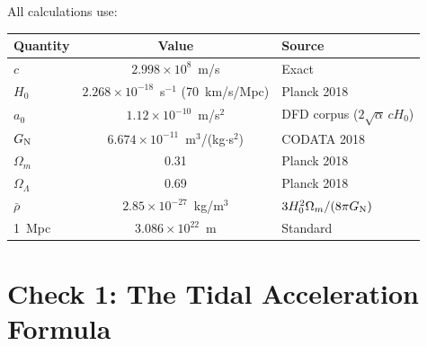 \documentclass[11pt,a4paper]{article}
\newcommand{\ee}[1]{\times 10^{#1}}
\newcommand{\Hzero}{H_0}
\newcommand{\aM}{a_0}
\newcommand{\GN}{G_{\rm N}}
\newcommand{\Omm}{\Omega_m}
\newcommand{\OmL}{\Omega_\Lambda}
\begin{document}
All calculations use:
\begin{center}
\begin{tabular}{lcl}
\toprule
\textbf{Quantity} & \textbf{Value} & \textbf{Source} \\
\midrule
$c$ & $2.998\ee{8}$~m/s & Exact \\
$\Hzero$ & $2.268\ee{-18}$~s$^{-1}$ (70~km/s/Mpc) & Planck 2018 \\
$\aM$ & $1.12\ee{-10}$~m/s$^2$ & DFD corpus ($2\sqrt{\alpha}\,c\Hzero$) \\
$\GN$ & $6.674\ee{-11}$~m$^3$/(kg$\cdot$s$^2$) & CODATA 2018 \\
$\Omm$ & 0.31 & Planck 2018 \\
$\OmL$ & 0.69 & Planck 2018 \\
$\bar{\rho}$ & $2.85\ee{-27}$~kg/m$^3$ & $3\Hzero^2\Omm/(8\pi\GN)$ \\
1~Mpc & $3.086\ee{22}$~m & Standard \\
\bottomrule
\end{tabular}
\end{center}


\section{Check 1: The Tidal Acceleration Formula}
\label{sec:check1}
\end{document}
